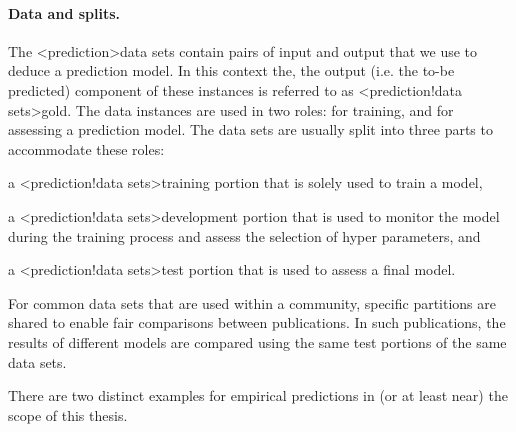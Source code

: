 \documentclass[../document.tex]{subfiles}
\begin{document}
    \paragraph{Data and splits.}
    The <prediction>{data sets} contain pairs of input and output that we use to deduce a prediction model.
    In this context the, the output (i.e. the to-be predicted) component of these instances is referred to as <prediction!data sets>{gold}.
    The data instances are used in two roles: for training, and for assessing a prediction model.
    The data sets are usually split into three parts to accommodate these roles:
    \begin{inparaenum}
        \item a <prediction!data sets>{training portion} that is solely used to train a model,
        \item a <prediction!data sets>{development portion} that is used to monitor the model during the training process and assess the selection of hyper parameters, and
        \item a <prediction!data sets>{test portion} that is used to assess a final model.
    \end{inparaenum}
    For common data sets that are used within a community, specific partitions are shared to enable fair comparisons between publications.
    In such publications, the results of different models are compared using the same test portions of the same data sets.

    There are two distinct examples for empirical predictions in (or at least near) the scope of this thesis.
\end{document}
